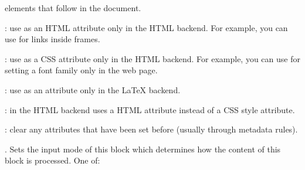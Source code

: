 \documentclass{book}
\begin{document}
\begin{mdUl}[class={list-star,compact},data-line={3367}]
\begin{mdLi}[data-line={3393}]
  elements that follow in the document.%
\end{mdLi}%
\begin{mdLi}[data-line={3395}]%
{}%
{}%
{}: use %
{}%
{} as an HTML attribute only in the HTML backend. For example,
  you can use %
{}%
{} for links inside frames.%
\end{mdLi}%
\begin{mdLi}[data-line={3397}]%
{}%
{}%
{}: use %
{}%
{} as a CSS attribute only in the HTML backend. For example,
  you can use %
{}%
{} for setting a font family only in the web page.%
\end{mdLi}%
\begin{mdLi}[data-line={3399}]%
{}%
{}%
{}: use %
{}%
{} as an attribute only in the LaTeX backend.%
\end{mdLi}%
\begin{mdLi}[data-line={3400}]%
{}%
{}%
{}: in the HTML backend uses a HTML attribute %
{}%
{}%
{} instead of a
  CSS style attribute.%
\end{mdLi}%
\begin{mdLi}[data-line={3402}]%
{}\mdCode[class={code,code1}]{-}%
{}: clear any attributes that have been set before (usually through metadata rules).%
\end{mdLi}%
\begin{mdLi}[data-line={3403}]%
{}%
{}%
{}. Sets the input mode of this block which determines how the content
  of this block is processed. One of:
\begin{mdUl}[class={list-dash,compact},data-line={3405}]%
\begin{mdLi}[data-line={3405}]%
{}%

\end{mdLi}
\end{mdUl}
\end{mdLi}
\end{mdUl}
\end{document}
